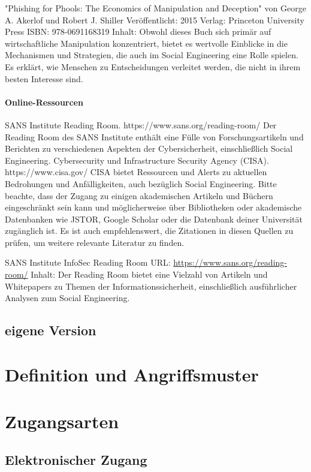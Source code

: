 "Phishing for Phools: The Economics of Manipulation and Deception" von George A. Akerlof und Robert J. Shiller
Veröffentlicht: 2015
Verlag: Princeton University Press
ISBN: 978-0691168319
Inhalt: Obwohl dieses Buch sich primär auf wirtschaftliche Manipulation konzentriert, bietet es wertvolle Einblicke in die Mechanismen und Strategien, die auch im Social Engineering eine Rolle spielen. Es erklärt, wie Menschen zu Entscheidungen verleitet werden, die nicht in ihrem besten Interesse sind.

\paragraph*{Online-Ressourcen}
SANS Institute Reading Room. https://www.sans.org/reading-room/ Der Reading Room des SANS Institute enthält eine Fülle von Forschungsartikeln und Berichten zu verschiedenen Aspekten der Cybersicherheit, einschließlich Social Engineering.
Cybersecurity und Infrastructure Security Agency (CISA). https://www.cisa.gov/ CISA bietet Ressourcen und Alerts zu aktuellen Bedrohungen und Anfälligkeiten, auch bezüglich Social Engineering.
Bitte beachte, dass der Zugang zu einigen akademischen Artikeln und Büchern eingeschränkt sein kann und möglicherweise über Bibliotheken oder akademische Datenbanken wie JSTOR, Google Scholar oder die Datenbank deiner Universität zugänglich ist. Es ist auch empfehlenswert, die Zitationen in diesen Quellen zu prüfen, um weitere relevante Literatur zu finden.

SANS Institute InfoSec Reading Room
URL: \url{https://www.sans.org/reading-room/}
Inhalt: Der Reading Room bietet eine Vielzahl von Artikeln und Whitepapers zu Themen der Informationssicherheit, einschließlich ausführlicher Analysen zum Social Engineering.

\subsection*{eigene Version}

\section{Definition und Angriffsmuster}

\section{Zugangsarten}

\subsection{Elektronischer Zugang}
